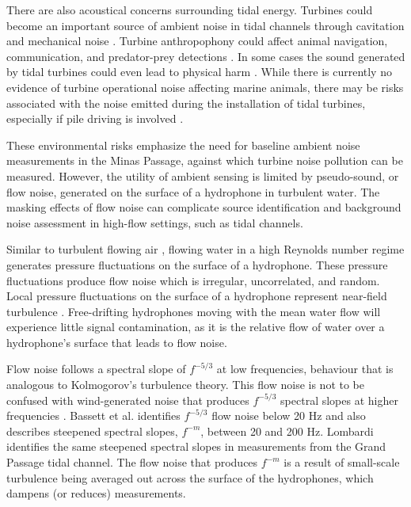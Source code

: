 \documentclass[12pt,journal,onecolumn]{IEEEtran}
\begin{document}
There are also acoustical concerns surrounding tidal energy. Turbines could become an important source of ambient noise in tidal channels through cavitation and mechanical noise \cite{wang}. Turbine anthropophony could affect animal navigation, communication, and predator-prey detections \cite{lombardi}. In some cases the sound generated by tidal turbines could even lead to physical harm \cite{copping}. While there is currently no evidence of turbine operational noise affecting marine animals, there may be risks associated with the noise emitted during the installation of tidal turbines, especially if pile driving is involved \cite{polagye}. %

These environmental risks emphasize the need for baseline ambient noise measurements in the Minas Passage, against which turbine noise pollution can be measured. However, the utility of ambient sensing is limited by pseudo-sound, or flow noise, generated on the surface of a hydrophone in turbulent water. The masking effects of flow noise can complicate source identification and background noise assessment in high-flow settings, such as tidal channels.

Similar to turbulent flowing air \cite{light}, flowing water in a high Reynolds number regime generates pressure fluctuations on the surface of a hydrophone. These pressure fluctuations produce flow noise which is irregular, uncorrelated, and random. Local pressure fluctuations on the surface of a hydrophone represent near-field turbulence \cite{strasberg}. Free-drifting hydrophones moving with the mean water flow will experience little signal contamination, as it is the relative flow of water over a hydrophone's surface that leads to flow noise.  

Flow noise follows a spectral slope of $f^{-5/3}$ at low frequencies, behaviour that is analogous to Kolmogorov's turbulence theory. This flow noise is not to be confused with wind-generated noise that produces $f^{-5/3}$ spectral slopes at higher frequencies \cite{knud}. Bassett et al. \cite{bassett} identifies $f^{-5/3}$ flow noise below 20 Hz and also describes steepened spectral slopes, $f^{-m}$, between 20 and 200 Hz. Lombardi \cite{lombardi} identifies the same steepened spectral slopes in measurements from the Grand Passage tidal channel. The flow noise that produces $f^{-m}$ is a result of small-scale turbulence being averaged out across the surface of the hydrophones, which dampens (or reduces) measurements.
\end{document}
